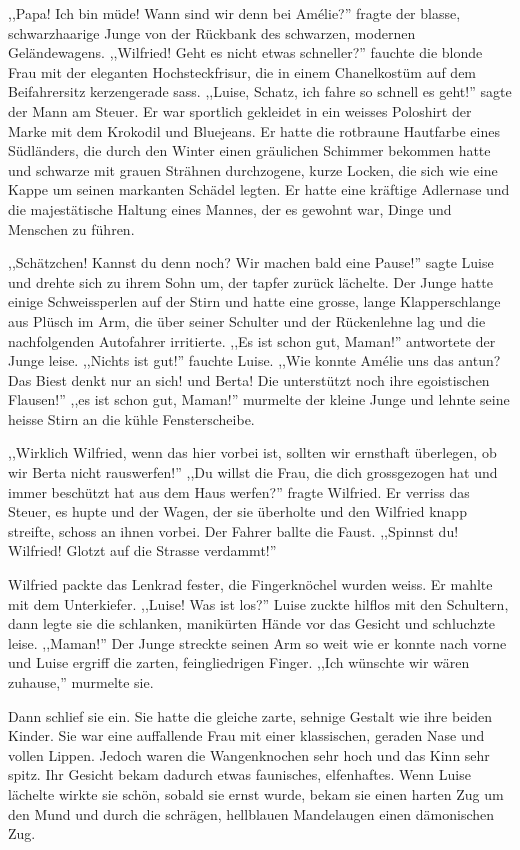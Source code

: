 \documentclass[11pt,titlepage,a5paper]{book}
\begin{document}
,,Papa! Ich bin müde! Wann sind wir denn bei Amélie?'' fragte der blasse, schwarzhaarige Junge von der Rückbank des schwarzen, modernen Geländewagens. ,,Wilfried! Geht es nicht etwas schneller?'' fauchte die blonde Frau mit der eleganten Hochsteckfrisur, die in einem Chanelkostüm auf dem Beifahrersitz kerzengerade sass. ,,Luise, Schatz, ich fahre so schnell es geht!'' sagte der Mann am Steuer. Er war sportlich gekleidet in ein weisses Poloshirt der Marke mit dem Krokodil und Bluejeans. Er hatte die rotbraune Hautfarbe eines Südländers, die durch den Winter einen gräulichen Schimmer bekommen hatte und schwarze mit grauen Strähnen durchzogene, kurze Locken, die sich wie eine Kappe um seinen markanten Schädel legten. Er hatte eine kräftige Adlernase und die majestätische Haltung eines Mannes, der es gewohnt war, Dinge und Menschen zu führen.

,,Schätzchen! Kannst du denn noch? Wir machen bald eine Pause!'' sagte Luise und drehte sich zu ihrem Sohn um, der tapfer zurück lächelte. Der Junge hatte einige Schweissperlen auf der Stirn und hatte eine grosse, lange Klapperschlange aus Plüsch im Arm, die über seiner Schulter und der Rückenlehne lag und die nachfolgenden Autofahrer irritierte. ,,Es ist schon gut, Maman!'' antwortete der Junge leise. ,,Nichts ist gut!'' fauchte Luise. ,,Wie konnte Amélie uns das antun? Das Biest denkt nur an sich! und Berta! Die unterstützt noch ihre egoistischen Flausen!'' ,,es ist schon gut, Maman!'' murmelte der kleine Junge und lehnte seine heisse Stirn an die kühle Fensterscheibe.

,,Wirklich Wilfried, wenn das hier vorbei ist, sollten wir ernsthaft überlegen, ob wir Berta nicht rauswerfen!'' ,,Du willst die Frau, die dich grossgezogen hat und immer beschützt hat aus dem Haus werfen?'' fragte Wilfried. Er verriss das Steuer, es hupte und der Wagen, der sie überholte und den Wilfried knapp streifte, schoss an ihnen vorbei. Der Fahrer ballte die Faust. ,,Spinnst du! Wilfried! Glotzt auf die Strasse verdammt!''

Wilfried packte das Lenkrad fester, die Fingerknöchel wurden weiss. Er mahlte mit dem Unterkiefer. ,,Luise! Was ist los?'' Luise zuckte hilflos mit den Schultern, dann legte sie die schlanken, manikürten Hände vor das Gesicht und schluchzte leise. ,,Maman!'' Der Junge streckte seinen Arm so weit wie er konnte nach vorne und Luise ergriff die zarten, feingliedrigen Finger. ,,Ich wünschte wir wären zuhause,'' murmelte sie. 

Dann schlief sie ein. Sie hatte die gleiche zarte, sehnige Gestalt wie ihre beiden Kinder. Sie war eine auffallende Frau mit einer klassischen, geraden Nase und vollen Lippen. Jedoch waren die Wangenknochen sehr hoch und das Kinn sehr spitz. Ihr Gesicht bekam dadurch etwas faunisches, elfenhaftes. Wenn Luise lächelte wirkte sie schön, sobald sie ernst wurde, bekam sie einen harten Zug um den Mund und durch die schrägen, hellblauen Mandelaugen einen dämonischen Zug.
\end{document}

